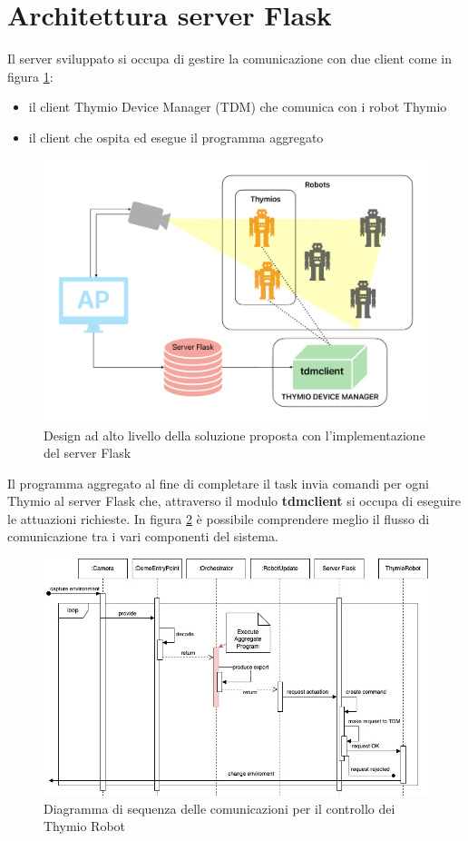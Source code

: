 \documentclass[12pt,a4paper,openright,twoside]{book}
\begin{document}
\section{Architettura server Flask}

Il server sviluppato si occupa di gestire la comunicazione con due client come in figura \ref{fig:server-arc}:
\begin{itemize}
    \item il client Thymio Device Manager (TDM) che comunica con i robot Thymio
    \item il client che ospita ed esegue il programma aggregato
\end{itemize}

\begin{figure}
    \centering
    \includegraphics[width=.8\linewidth]{figures/server-arc.pdf}
    \caption{Design ad alto livello della soluzione proposta con l'implementazione del server Flask}
    \label{fig:server-arc}
\end{figure}

Il programma aggregato al fine di completare il task invia comandi per ogni Thymio al server Flask che, attraverso il modulo \textbf{tdmclient} si occupa di eseguire le attuazioni richieste. In figura \ref{fig:sequence} è possibile comprendere meglio il flusso di comunicazione tra i vari componenti del sistema. 

\begin{figure}
    \centering
    \includegraphics[width=.99\linewidth,angle=90]{figures/sequence.jpg}
    \caption{Diagramma di sequenza delle comunicazioni per il controllo dei Thymio Robot}
    \label{fig:sequence}
\end{figure}
\end{document}
